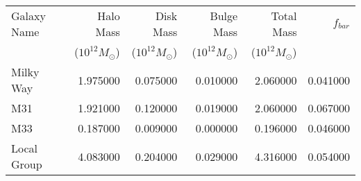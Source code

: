 \documentclass{article}
\begin{document}
\begin{tabular}{lrrrrr}
\toprule
Galaxy Name & Halo Mass & Disk Mass & Bulge Mass & Total Mass & $f_{bar}$ \\
	    & ($10^{12}M_{\odot}$) & ($10^{12}M_{\odot}$) & ($10^{12}M_{\odot}$) & ($10^{12}M_{\odot}$) & \\
\midrule
Milky Way & 1.975000 & 0.075000 & 0.010000 & 2.060000 & 0.041000 \\
M31 & 1.921000 & 0.120000 & 0.019000 & 2.060000 & 0.067000 \\
M33 & 0.187000 & 0.009000 & 0.000000 & 0.196000 & 0.046000 \\
\midrule
Local Group & 4.083000 & 0.204000 & 0.029000 & 4.316000 & 0.054000 \\
\bottomrule
\end{tabular}
\end{document}
